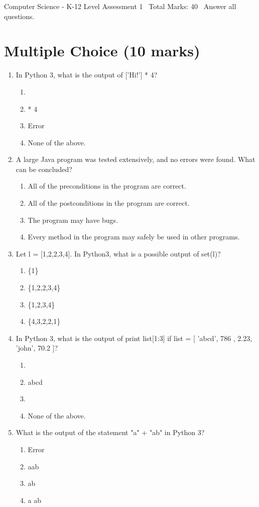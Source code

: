 \documentclass[12pt]{article}
\begin{document}
\begin{center}
Computer Science - K-12 Level Assessment 1 \
Total Marks: 40 \
Answer all questions.
\end{center}

\section*{Multiple Choice (10 marks)}
\begin{enumerate}[label=\arabic*.]
\item In Python 3, what is the output of ['Hi!'] * 4?
\begin{enumerate}[label=(\alph*)]
    \item ['Hi!', 'Hi!', 'Hi!', 'Hi!']
    \item ['Hi!'] * 4
    \item Error
    \item None of the above.
\end{enumerate}
\item A large Java program was tested extensively, and no errors were found. What can be
concluded?
\begin{enumerate}[label=(\alph*)]
    \item All of the preconditions in the program are correct.
    \item All of the postconditions in the program are correct.
    \item The program may have bugs.
    \item Every method in the program may safely be used in other programs.
\end{enumerate}
\item Let l = [1,2,2,3,4]. In Python3, what is a possible output of set(l)?
\begin{enumerate}[label=(\alph*)]
    \item \{1\}
    \item \{1,2,2,3,4\}
    \item \{1,2,3,4\}
    \item \{4,3,2,2,1\}
\end{enumerate}
\item In Python 3, what is the output of print list[1:3] if list = [ 'abcd', 786 , 2.23, 'john',
70.2 ]?
\begin{enumerate}[label=(\alph*)]
    \item [ 'abcd', 786 , 2.23, 'john', 70.2 ]
    \item abcd
    \item [786, 2.23]
    \item None of the above.
\end{enumerate}
\item What is the output of the statement "a" + "ab" in Python 3?
\begin{enumerate}[label=(\alph*)]
    \item Error
    \item aab
    \item ab
    \item a ab
\end{enumerate}
\end{enumerate}
\end{document}
